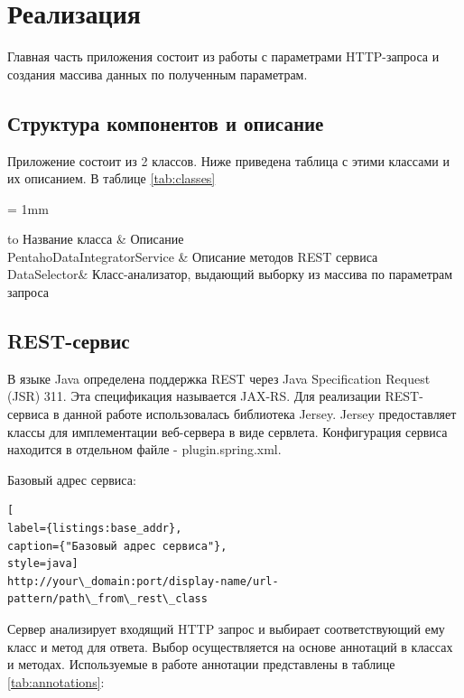 \section{Реализация}

Главная часть приложения состоит из работы с параметрами HTTP-запроса и создания массива данных по полученным параметрам.

\subsection{Структура компонентов и описание}

Приложение состоит из 2 классов. Ниже приведена таблица с этими классами и их описанием. В таблице \ref{tab:classes}

\tabulinesep = 1mm
\begin{longtabu} to \textwidth {| X[c,m] | X[c,m] |}
	\firsthline\hline
	Название класса & Описание\\ \hline
	\endfirsthead
	PentahoDataIntegratorService & Описание методов REST сервиса\\ \hline
	DataSelector& Класс-анализатор, выдающий выборку из массива по параметрам запроса\\ \hline
	\caption{Классы и их описание}
	\label{tab:classes}
\end{longtabu}

\subsection{REST-сервис}

В языке Java определена поддержка REST через Java Specification Request (JSR) 311.\cite{jsr} Эта спецификация называется JAX-RS. Для реализации REST-сервиса в данной работе использовалась библиотека Jersey. Jersey предоставляет классы для имплементации веб-сервера в виде сервлета. Конфигурация сервиса находится в отдельном файле - plugin.spring.xml.

Базовый адрес сервиса:

\begin{lstlisting}[
label={listings:base_addr},
caption={"Базовый адрес сервиса"},
style=java]
http://your\_domain:port/display-name/url-pattern/path\_from\_rest\_class
\end{lstlisting}

Сервер анализирует входящий HTTP запрос и выбирает соответствующий ему класс и метод для ответа. Выбор осуществляется на основе аннотаций в классах и методах. Используемые в работе аннотации представлены в таблице \ref{tab:annotations}:

